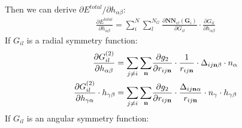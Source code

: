 \documentclass[preprint]{revtex4-2}
\begin{document}
\newcommand{\hab}{h_{\alpha\beta}}
\newcommand{\hga}{h_{\gamma\alpha}}
\newcommand{\hgb}{h_{\gamma\beta}}

Then we can derive $\partial E^{total} / \partial \hab$:
\begin{align}
\label{eq:dEdhab}
\frac{\partial E^{total}}{\partial \hab} = \sum_{i}^{N}{\sum_{l}^{N_G}}{
    \frac{\partial \mathbf{NN}_{el}(\mathbf{G}_i)}{\partial G_{il}}
    \cdot
    \frac{\partial G_{il}}{\partial \hab}
}
\end{align}
If $G_{il}$ is a radial symmetry function:
\begin{align}
\frac{\partial G_{il}^{(2)}}{\partial \hab} 
& = \sum_{j \neq i}{\sum_{\mathbf{n}}}{
    \frac{\partial g_2}{\partial \rijn} 
    \cdot 
    \frac{1}{\rijn} \cdot \Delta_{ij\mathbf{n}\beta} \cdot n_{\alpha}
} \\
\label{eq:stress_g2_right}
\frac{\partial G_{il}^{(2)}}{\partial \hga} \cdot \hgb & = 
\sum_{j \neq i}{\sum_{\mathbf{n}}}{
    \frac{\partial g_2}{\partial \rijn} 
    \cdot 
    \frac{\Delta_{ij\mathbf{n}\alpha}}{\rijn} \cdot n_{\gamma}
} \cdot \hgb
\end{align}
If $G_{il}$ is an angular symmetry function:
\end{document}
